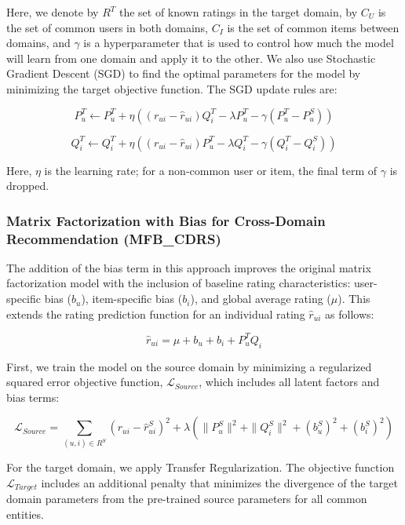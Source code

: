\documentclass[pdflatex,sn-mathphys-num]{sn-jnl}%
\theoremstyle{thmstyleone}%
\theoremstyle{thmstyletwo}%
\theoremstyle{thmstylethree}%
\begin{document}
Here, we denote by $R^T$ the set of known ratings in the target domain, by $C_U$ is the set of common users in both domains, $C_I$ is the set of common items between domains, and $\gamma$ is a hyperparameter that is used to control how much the model will learn from one domain and apply it to the other. We also use Stochastic Gradient Descent (SGD) to find the optimal parameters for the model by minimizing the target objective function. The SGD update rules are:

\begin{equation}
P_u^T \leftarrow P_u^T + \eta \left( (r_{ui} - \hat{r}_{ui})Q_i^T - \lambda P_u^T - \gamma (P_u^T - P_u^S) \right)
\end{equation}

\begin{equation}
Q_i^T \leftarrow Q_i^T + \eta \left( (r_{ui} - \hat{r}_{ui})P_u^T - \lambda Q_i^T - \gamma (Q_i^T - Q_i^S) \right)
\end{equation}

Here, $\eta$ is the learning rate; for a non-common user or item, the final term of $\gamma$  is dropped.

\subsubsection{Matrix Factorization with Bias for Cross-Domain Recommendation (MFB\_CDRS)}

The addition of the bias term in this approach improves the original matrix factorization model with the inclusion of baseline rating characteristics: user-specific bias ($b_u$), item-specific bias ($b_i$), and global average rating ($\mu$). This extends the rating prediction function for an individual rating $\hat{r}_{ui}$ as follows:

\begin{equation}
\hat{r}_{ui} = \mu + b_u + b_i + P_u^T Q_i
\end{equation}

First, we train the model on the source domain by minimizing a regularized squared error objective function, $\mathcal{L}_{Source}$, which includes all latent factors and bias terms:

\begin{equation}
\mathcal{L}_{Source} = \sum_{(u,i) \in R^S} (r_{ui} - \hat{r}_{ui}^S)^2 + \lambda \left( \|P_u^S\|^2 + \|Q_i^S\|^2 + (b_u^S)^2 + (b_i^S)^2 \right)
\end{equation}

For the target domain, we apply Transfer Regularization. The objective function $\mathcal{L}_{Target}$ includes an additional penalty that minimizes the divergence of the target domain parameters from the pre-trained source parameters for all common entities.
\end{document}
